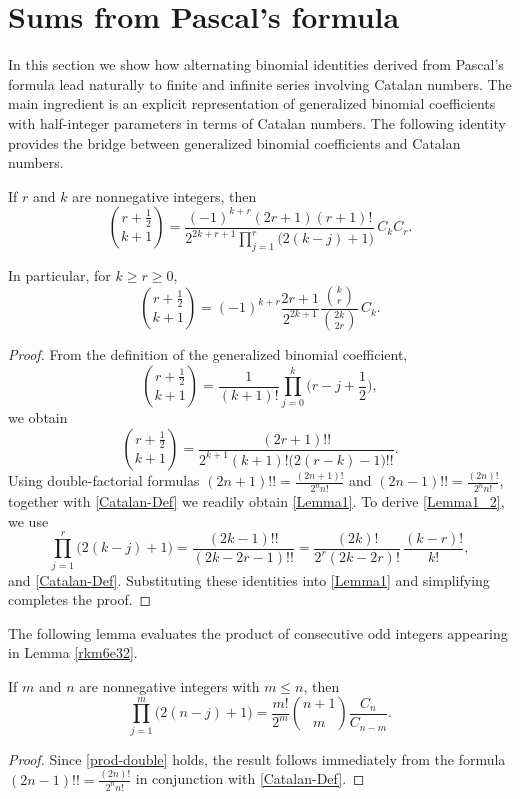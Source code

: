 \documentclass[12pt,reqno]{article}
\begin{document}
\section{Sums from Pascal's formula}


In this section we show how alternating binomial identities derived from Pascal's formula lead naturally to finite and infinite series involving Catalan numbers. The main ingredient is an explicit representation of generalized binomial coefficients with half-integer parameters in terms of Catalan numbers. The following identity provides the bridge between generalized binomial coefficients and Catalan numbers.
\begin{lemma}\label{rkm6e32}
If $r$ and $k$ are nonnegative integers, then
\begin{equation}\label{Lemma1}
\binom{r+\frac12}{k+1} = \frac{(-1)^{k+r}(2r+1)(r+1)!} {2^{2k+r+1}\prod\limits_{j=1}^{r}\bigl(2(k-j)+1\bigr)}\,C_kC_r.
\end{equation}

In particular, for $k\ge r\ge0$,
\begin{equation}\label{Lemma1_2}
\binom{r+\frac12}{k+1} = (-1)^{k+r} \frac{2r+1}{2^{2k+1}} \frac{\binom{k}{r}}{\binom{2k}{2r}}\,C_k. 
\end{equation}
\end{lemma}
\begin{proof}
From the definition of the generalized binomial coefficient,
\begin{equation*} \binom{r+\frac12}{k+1} = \frac1{(k+1)!} \prod_{j=0}^{k}\Big(r-j+\frac12\Big),
\end{equation*}
we obtain
\[
 \binom{r+\frac12}{k+1} = \frac{(2r+1)!!}{2^{k+1}(k+1)!\big(2(r-k)-1\big)!!}.
\]
Using double-factorial formulas
$(2n+1)!!=\frac{(2n+1)!}{2^n n!}$ and $(2n-1)!!=\frac{(2n)!}{2^n n!}$, together with \eqref{Catalan-Def}
we readily obtain \eqref{Lemma1}. To derive \eqref{Lemma1_2}, we use
\begin{equation}\label{prod-double}
	\prod_{j=1}^{r}\bigl(2(k-j)+1\bigr) = \frac{(2k-1)!!}{(2k-2r-1)!!} = \frac{(2k)!}{2^r(2k-2r)!}\,\frac{(k-r)!}{k!},
\end{equation}
and \eqref{Catalan-Def}. Substituting these identities into \eqref{Lemma1} and simplifying completes the proof.
\end{proof}

The following lemma evaluates the product of consecutive odd integers appearing in Lemma \ref{rkm6e32}.
\begin{lemma}\label{vfidc73}
If $m$ and $n$ are nonnegative integers with $m \le n$, then
\begin{equation*}
\prod_{j = 1}^m \!\big(2(n - j) + 1\big) = \frac{m!}{2^m}\binom{n+1}{m}\frac{C_n}{C_{n - m}}.
\end{equation*}
\end{lemma}
\begin{proof}
Since \eqref{prod-double} holds, the result follows immediately from the formula $(2n-1)!!=\frac{(2n)!}{2^n n!}$ in conjunction  
with \eqref{Catalan-Def}. 
\end{proof}
\end{document}
